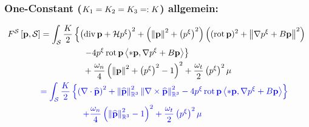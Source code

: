 \documentclass[a4paper,11pt]{scrartcl}
\begin{document}
  \subsubsection{One-Constant (\( {K_1}={K_2}={K_3}=:{K} \)) allgemein:}
  \begin{align}
      F^{\mathcal{S}}\left[ \mathbf{p}, \mathcal{S} \right] 
          &= \int_{\mathcal{S}} \frac{{K}}{2} \left\{ 
               \left( \operatorname{div}{\mathbf{p}} + \mathcal{H} p^{\xi} \right)^{2} 
                                              +\left( \left\| \mathbf{p} \right\|^{2} + \left( p^{\xi} \right)^{2} \right) 
                                                 \left((\operatorname{rot}\mathbf{p})^{2} + \left\| \nabla p^{\xi} + B\mathbf{p} \right\|^{2} \right)\right.\\
          &\hspace{50pt}\left. -4p^{\xi}\operatorname{rot}\mathbf{p}\left\langle *\mathbf{p},  \nabla p^{\xi} + B\mathbf{p}\right\rangle \right\}\\
          &\hspace{50pt} +\frac{{\omega_n}}{4} \left( \left\| \mathbf{p} \right\|^{2} + \left( p^{\xi} \right)^{2}  - 1  \right)^{2} 
                        + \frac{{\omega_t}}{2}\left( p^{\xi} \right)^{2} \mu \\
          &{\color{blue}= \int_{\mathcal{S}} \frac{{K}}{2} \left\{ \left( \nabla\cdot\widehat{\mathbf{p}} \right)^{2} 
                                  +\left\| \widehat{\mathbf{p}} \right\|^{2}_{\mathbb{R}^{3}}\left\| \nabla\times\widehat{\mathbf{p}} \right\|^{2}_{\mathbb{R}^{3}}
                             -4p^{\xi}\operatorname{rot}\mathbf{p}\left\langle *\mathbf{p},  \nabla p^{\xi} + B\mathbf{p}\right\rangle \right\}}\\
          &{\color{blue}\hspace{50pt} +\frac{{\omega_n}}{4} \left( \left\| \widehat{\mathbf{p}} \right\|^{2}_{\mathbb{R}^{3}}  - 1  \right)^{2} 
                        + \frac{{\omega_t}}{2}\left( p^{\xi} \right)^{2} \mu
                             }
  \end{align}
    
\end{document}

